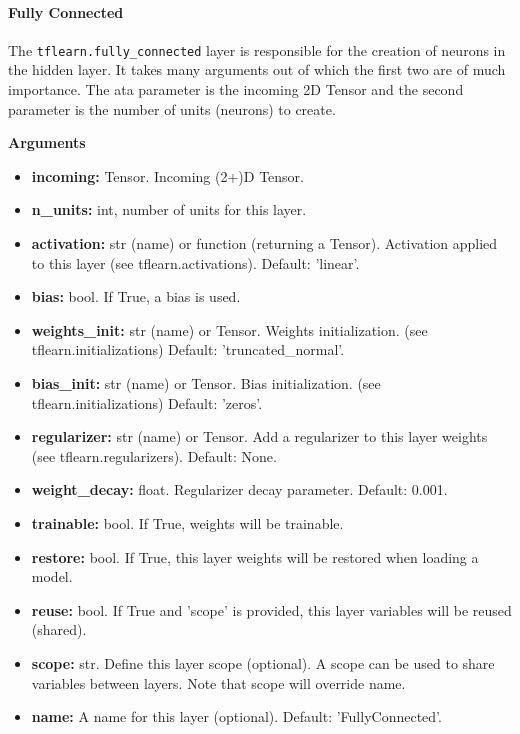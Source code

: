 \documentclass[conference,compsoc]{IEEEtran}
\begin{document}
\paragraph{Fully Connected}

The \texttt{tflearn.fully\_connected} layer is responsible for the creation of neurons in the hidden layer. It takes many arguments out of which the first two are of much importance. The ata parameter is  the incoming 2D Tensor and the second parameter is the number of units (neurons) to create.

\textbf{Arguments}

\begin{itemize}
    \item \textbf{incoming:} Tensor. Incoming (2+)D Tensor.
    \item \textbf{n\_units:} int, number of units for this layer.
    \item \textbf{activation:} str (name) or function (returning a Tensor). Activation applied to this layer (see tflearn.activations). Default: 'linear'.
    \item \textbf{bias:} bool. If True, a bias is used.
    \item \textbf{weights\_init:} str (name) or Tensor. Weights initialization. (see tflearn.initializations) Default: 'truncated\_normal'.
    \item \textbf{bias\_init:} str (name) or Tensor. Bias initialization. (see tflearn.initializations) Default: 'zeros'.
    \item \textbf{regularizer:} str (name) or Tensor. Add a regularizer to this layer weights (see tflearn.regularizers). Default: None.
    \item \textbf{weight\_decay:} float. Regularizer decay parameter. Default: 0.001.
    \item \textbf{trainable:} bool. If True, weights will be trainable.
    \item \textbf{restore:} bool. If True, this layer weights will be restored when loading a model.
    \item \textbf{reuse:} bool. If True and 'scope' is provided, this layer variables will be reused (shared).
    \item \textbf{scope:} str. Define this layer scope (optional). A scope can be used to share variables between layers. Note that scope will override name.
    \item \textbf{name:} A name for this layer (optional). Default: 'FullyConnected'.    
\end{itemize}
\end{document}
